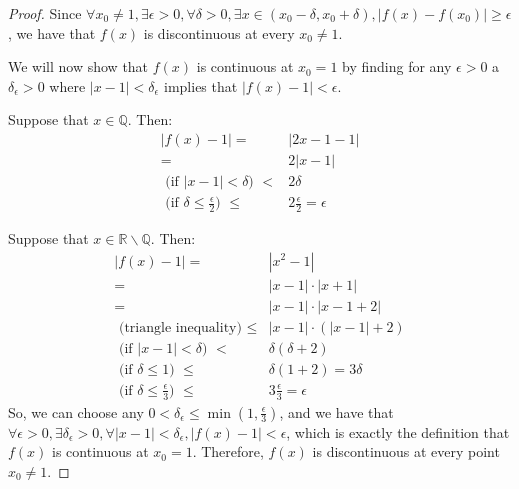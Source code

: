 \documentclass{article}
\newcommand{\reals}{\ensuremath{\mathbb{R}}}
\newcommand{\rats}{\ensuremath{\mathbb{Q}}}
\newcommand{\irats}{\ensuremath{\reals \backslash \rats}}
\newcommand{\eps}{\ensuremath{\epsilon}}
\newcommand{\pt}[1]{\textrm{ #1 }}
\begin{document}
\begin{proof}
	Since $\forall x_0 \neq 1,
	\exists \eps > 0,
	\forall \delta > 0,
	\exists x \in (x_0 - \delta, x_0 + \delta),
	|f(x) - f(x_0)| \geq \eps$,
	we have that $f(x)$
	is discontinuous
	at every $x_0 \neq 1$.

	We will now show that
	$f(x)$ is continuous at $x_0 = 1$
	by finding for any $\eps > 0$
	a $\delta_\eps > 0$
	where $|x - 1| < \delta_\eps$
	implies that $|f(x) - 1| < \eps$.

	Suppose that $x \in \rats$. Then:
	\begin{align}
		|f(x) - 1| = & |2x - 1 - 1| \\
			   = & 2|x - 1| \\
		\pt{(if $|x - 1| < \delta$)} < & 2\delta \\
		\pt{(if $\delta \le \frac{\eps}{2}$)} \le & 2 \frac{\eps}{2} = \eps
	\end{align}

	Suppose that $x \in \irats$. Then:
	\begin{align}
		|f(x) - 1| = & |x^2 - 1| \\
			   = & |x - 1| \cdot |x + 1| \\
			   = & |x - 1| \cdot |x - 1 + 2| \\
			   \pt{(triangle inequality)} \le & |x - 1| \cdot (|x - 1|+ 2) \\
			   \pt{(if $|x - 1| < \delta$)} < & \delta(\delta + 2) \\
			   \pt{(if $\delta \le 1$)} \le & \delta(1 + 2) = 3\delta \\
		\pt{(if $\delta \le \frac{\eps}{3}$)} \le & 3 \frac{\eps}{3} = \eps
	\end{align}
	So, we can choose any $0 < \delta_\eps \le \min(1, \frac{\eps}{3})$,
	and we have that
	$\forall \eps > 0,
	\exists \delta_\eps > 0,
	\forall |x - 1| < \delta_\eps,
	|f(x) - 1| < \eps$,
	which is exactly the definition
	that $f(x)$ is continuous at $x_0 = 1$.
	Therefore,
	$f(x)$ is discontinuous at every point $x_0 \neq 1$.
\end{proof}
\end{document}
